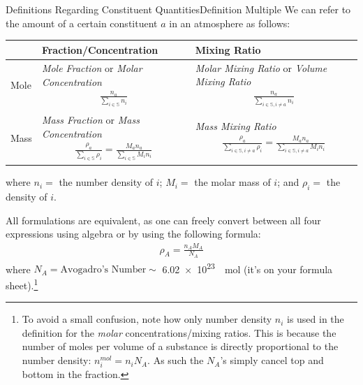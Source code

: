 \begin{fact}{Definitions Regarding Constituent Quantities}{Definition Multiple}\label{Definition Multiple}
    We can refer to the amount of a certain constituent $a$ in an atmosphere as follows:\newline\newline
    \begin{tabular}{|p{0.8cm}|p{6.5cm}|p{7.5cm}|}
        \hline
        & Fraction/Concentration & Mixing Ratio \\
        \hline
        Mole & \textit{Mole Fraction} or \textit{Molar Concentration} \begin{align*}
            \frac{n_a}{\sum\limits_{i\in\mathbb{S}} n_i}
        \end{align*} & \textit{Molar Mixing Ratio} or \textit{Volume Mixing Ratio} \begin{align*}
            \frac{n_a}{\sum\limits_{i\in\mathbb{S},i\neq a} n_i}
        \end{align*}
        \\
        \hline
        Mass & \textit{Mass Fraction} or \textit{Mass Concentration} \begin{align*}
            \frac{\rho_a}{\sum\limits_{i\in\mathbb{S}} \rho_i}
            =
            \frac{M_an_a}{\sum\limits_{i\in\mathbb{S}} M_in_i}
        \end{align*} & \textit{Mass Mixing Ratio} \begin{align*}
            \frac{\rho_a}{\sum\limits_{i\in\mathbb{S},i\neq a} \rho_i}
            =
            \frac{M_an_a}{\sum\limits_{i\in\mathbb{S},i\neq a} M_in_i}
        \end{align*}\\
        \hline
    \end{tabular}\newline

    where $n_i=$ the number density of $i$; $M_i=$ the molar mass of $i$; and $\rho_i=$ the density of $i$.

    All formulations are equivalent, as one can freely convert between all four expressions using algebra or by using the following formula:
    \begin{align}\label{density to number}
        \rho_A=\frac{n_AM_A}{N_A}
    \end{align}
    where $N_A=\text{Avogadro's Number}\sim$ \qty{6.02e23}{\per\mole} (it's on your formula sheet).\footnote{
        To avoid a small confusion, note how only number density $n_i$ is used in the definition for the \textit{molar} concentrations/mixing ratios. This is because the number of moles per volume of a substance is directly proportional to the number density: $n_i^{mol}=n_iN_A$. As such the $N_A$'s simply cancel top and bottom in the fraction.
    } 
\end{fact}


